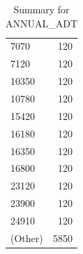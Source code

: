 \begin{table}[ht]
\begin{tabular}{lr}
  7070 & 120 \\ 
  7120 & 120 \\ 
  10350 & 120 \\ 
  10780 & 120 \\ 
  15420 & 120 \\ 
  16180 & 120 \\ 
  16350 & 120 \\ 
  16800 & 120 \\ 
  23120 & 120 \\ 
  23900 & 120 \\ 
  24910 & 120 \\ 
  (Other) & 5850 \\ 
   \hline
\end{tabular}
\caption{Summary for ANNUAL_ADT} 
\label{tab: ANNUAL_ADT}
\end{table}
